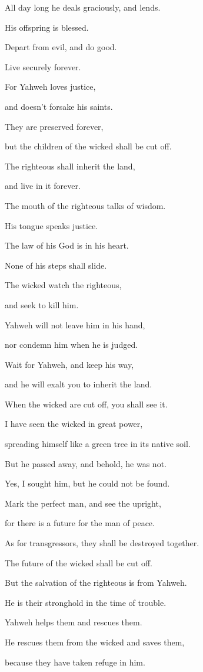 {\par }{\Q {}All day long he deals graciously, and lends.
\par }{\QB His offspring is blessed.
\par }{\Q {}Depart from evil, and do good.
\par }{\QB Live securely forever.
\par }{\Q {}For Yahweh loves justice,
\par }{\QB and doesn’t forsake his saints.
\par }{\QB They are preserved forever,
\par }{\QB but the children of the wicked shall be cut off.
\par }{\Q {}The righteous shall inherit the land,
\par }{\QB and live in it forever.
\par }{\BB \par }{\Q {}The mouth of the righteous talks of wisdom.
\par }{\QB His tongue speaks justice.
\par }{\Q {}The law of his God is in his heart.
\par }{\QB None of his steps shall slide.
\par }{\Q {}The wicked watch the righteous,
\par }{\QB and seek to kill him.
\par }{\Q {}Yahweh will not leave him in his hand,
\par }{\QB nor condemn him when he is judged.
\par }{\Q {}Wait for Yahweh, and keep his way,
\par }{\QB and he will exalt you to inherit the land.
\par }{\QB When the wicked are cut off, you shall see it.
\par }{\BB \par }{\Q {}I have seen the wicked in great power,
\par }{\QB spreading himself like a green tree in its native soil.
\par }{\Q {}But he passed away, and behold, he was not.
\par }{\QB Yes, I sought him, but he could not be found.
\par }{\Q {}Mark the perfect man, and see the upright,
\par }{\QB for there is a future for the man of peace.
\par }{\Q {}As for transgressors, they shall be destroyed together.
\par }{\QB The future of the wicked shall be cut off.
\par }{\Q {}But the salvation of the righteous is from Yahweh.
\par }{\QB He is their stronghold in the time of trouble.
\par }{\Q {}Yahweh helps them and rescues them.
\par }{\QB He rescues them from the wicked and saves them,
\par }{\QB because they have taken refuge in him.

}
